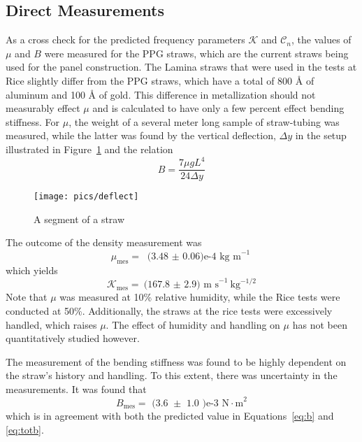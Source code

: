 \documentclass[twoside]{article}
\begin{document}
\begin{multicols}{2}
 



\section{Direct Measurements}
As a cross check for the predicted frequency parameters $\mathcal{K}$ and $\mathcal{C}_n$, the values of $\mu$ and $B$ were measured for the PPG straws, which are the current straws being used for the panel construction. The Lamina straws that were used in the tests at Rice slightly differ from the PPG straws, which have a total of 800 \r{A} of aluminum and 100 \r{A} of gold. This difference in metallization should not measurably effect $\mu$ and is calculated to have only a few percent effect bending stiffness.  For $\mu$, the weight of a several meter long sample of straw-tubing was measured, while the latter was found by the vertical deflection, $\Delta y$ in the setup illustrated in Figure~\ref{fig:deflect} and the relation
\begin{equation}
B = \frac{7  \mu g L^4}{24 \Delta y}
\end{equation}
\begin{figure}[H]
	\texttt{[image: pics/deflect]}
	\caption{A segment of a straw}
	\label{fig:deflect}
\end{figure}
The outcome  of the density measurement was
\begin{equation}
	\mu_\text{mes} = \text{  (3.48 $\pm$ 0.06)e-4  kg m}^{-1}
\label{eq:mesmu}
\end{equation}
which yields
\begin{equation}
\boxed{
\mathcal{K}_\text{mes}  = \text{(167.8 $\pm$ 2.9) m s}^{-1} \text{kg}^{-1/2}
}
\end{equation}
Note that $\mu$ was measured at 10\% relative humidity, while the Rice tests were conducted at 50\%. Additionally, the straws at the rice tests were excessively handled, which raises $\mu$.  The effect of humidity and handling on $\mu$ has not been quantitatively studied however.


The measurement of the bending stiffness was found to be highly dependent on the straw's history and handling. To this extent, there was uncertainty in the measurements. It was found that
\begin{equation}
	B_\text{mes} = \text{  (3.6 $\pm$ 1.0 )e-3  N$\cdot$m}^2
\end{equation}
which is in agreement with both the predicted value in Equations~\ref{eq:b} and \ref{eq:totb}. 


\end{multicols}
\end{document}
